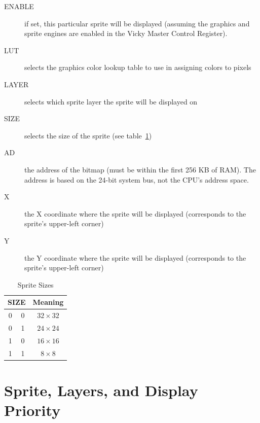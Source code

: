 \begin{description}
    \item[ENABLE] if set, this particular sprite will be displayed (assuming the graphics and sprite engines are enabled in the Vicky Master Control Register).

    \item[LUT] selects the graphics color lookup table to use in assigning colors to pixels

    \item[LAYER] selects which sprite layer the sprite will be displayed on

    \item[SIZE] selects the size of the sprite (see table~\ref{tab:sp_sizes})

    \item[AD] the address of the bitmap (must be within the first 256 KB of RAM). The address is based on the 24-bit system bus, not the CPU's address space.

    \item[X] the X coordinate where the sprite will be displayed (corresponds to the sprite's upper-left corner)

    \item[Y] the Y coordinate where the sprite will be displayed (corresponds to the sprite's upper-left corner)
\end{description}

\begin{table}[ht]
    \begin{center}
        \begin{tabular}{|c|c|c|} \hline
            \multicolumn{2}{|c|}{SIZE} & Meaning \\ \hline\hline
            0 & 0 & $32 \times 32$ \\ \hline
            0 & 1 & $24 \times 24$ \\ \hline
            1 & 0 & $16 \times 16$ \\ \hline
            1 & 1 & $8 \times 8$ \\ \hline
        \end{tabular}
    \end{center}
    \caption{Sprite Sizes}
    \label{tab:sp_sizes}
\end{table}

\section{Sprite, Layers, and Display Priority}

